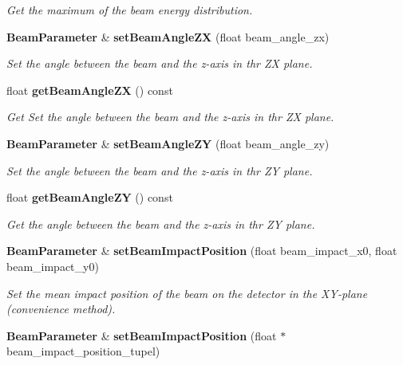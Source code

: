 \begin{DoxyCompactItemize}
\begin{DoxyCompactList}\small\item\em Get the maximum of the beam energy distribution. \item\end{DoxyCompactList}\item 
{\bf BeamParameter} \& {\bf setBeamAngleZX} (float beam\_\-angle\_\-zx)\label{classCALICE_1_1BeamParameter_ac1987bb9375229234b7bcd90c401f7bf}

\begin{DoxyCompactList}\small\item\em Set the angle between the beam and the z-\/axis in thr ZX plane. \item\end{DoxyCompactList}\item 
float {\bf getBeamAngleZX} () const \label{classCALICE_1_1BeamParameter_a0521b37942f8761e317b7780450c746d}

\begin{DoxyCompactList}\small\item\em Get Set the angle between the beam and the z-\/axis in thr ZX plane. \item\end{DoxyCompactList}\item 
{\bf BeamParameter} \& {\bf setBeamAngleZY} (float beam\_\-angle\_\-zy)\label{classCALICE_1_1BeamParameter_a861b31336d44f2084a325c3968eaa9bb}

\begin{DoxyCompactList}\small\item\em Set the angle between the beam and the z-\/axis in thr ZY plane. \item\end{DoxyCompactList}\item 
float {\bf getBeamAngleZY} () const \label{classCALICE_1_1BeamParameter_ac32fcba57ab64d4fcfd704bfc2ef627e}

\begin{DoxyCompactList}\small\item\em Get the angle between the beam and the z-\/axis in thr ZY plane. \item\end{DoxyCompactList}\item 
{\bf BeamParameter} \& {\bf setBeamImpactPosition} (float beam\_\-impact\_\-x0, float beam\_\-impact\_\-y0)\label{classCALICE_1_1BeamParameter_a0e5034d96cf4bad36b3e8757c5b57700}

\begin{DoxyCompactList}\small\item\em Set the mean impact position of the beam on the detector in the XY-\/plane (convenience method). \item\end{DoxyCompactList}\item 
{\bf BeamParameter} \& {\bf setBeamImpactPosition} (float $\ast$beam\_\-impact\_\-position\_\-tupel)\label{classCALICE_1_1BeamParameter_ac9bbf019b9a990aa64762c4f8383a235}


\end{DoxyCompactItemize}
